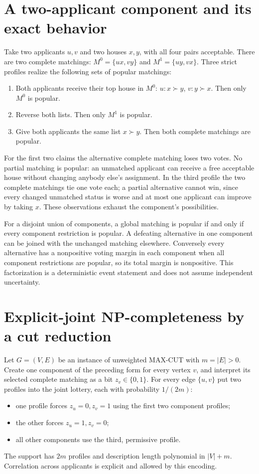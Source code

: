 \documentclass[11pt]{article}
\begin{document}
\section{A two-applicant component and its exact behavior}
Take two applicants $u,v$ and two houses $x,y$, with all four pairs acceptable. There are two complete matchings:
$M^0=\{ux,vy\}$ and $M^1=\{uy,vx\}$.
Three strict profiles realize the following sets of popular matchings:
\begin{enumerate}
\item Both applicants receive their top house in $M^0$: $u:x\succ y$, $v:y\succ x$. Then only $M^0$ is popular.
\item Reverse both lists. Then only $M^1$ is popular.
\item Give both applicants the same list $x\succ y$. Then both complete matchings are popular.
\end{enumerate}
For the first two claims the alternative complete matching loses two votes. No partial matching is popular: an unmatched applicant can receive a free acceptable house without changing anybody else's assignment. In the third profile the two complete matchings tie one vote each; a partial alternative cannot win, since every changed unmatched status is worse and at most one applicant can improve by taking $x$. These observations exhaust the component's possibilities.

For a disjoint union of components, a global matching is popular if and only if every component restriction is popular. A defeating alternative in one component can be joined with the unchanged matching elsewhere. Conversely every alternative has a nonpositive voting margin in each component when all component restrictions are popular, so its total margin is nonpositive. This factorization is a deterministic event statement and does not assume independent uncertainty.

\section{Explicit-joint NP-completeness by a cut reduction}
Let $G=(V,E)$ be an instance of unweighted MAX-CUT with $m=|E|>0$. Create one component of the preceding form for every vertex $v$, and interpret its selected complete matching as a bit $z_v\in\{0,1\}$. For every edge $\{u,v\}$ put two profiles into the joint lottery, each with probability $1/(2m)$:
\begin{itemize}
\item one profile forces $z_u=0,z_v=1$ using the first two component profiles;
\item the other forces $z_u=1,z_v=0$;
\item all other components use the third, permissive profile.
\end{itemize}
The support has $2m$ profiles and description length polynomial in $|V|+m$. Correlation across applicants is explicit and allowed by this encoding.
\end{document}
